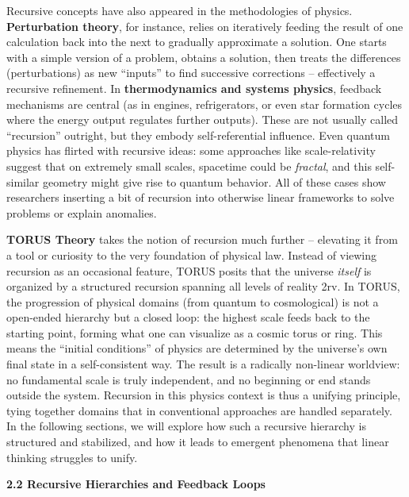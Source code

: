 \documentclass[
]{article}
\begin{document}
Recursive concepts have also appeared in the methodologies of physics.
\textbf{Perturbation theory}, for instance, relies on iteratively
feeding the result of one calculation back into the next to gradually
approximate a solution. One starts with a simple version of a problem,
obtains a solution, then treats the differences (perturbations) as new
``inputs'' to find successive corrections -- effectively a recursive
refinement. In \textbf{thermodynamics and systems physics}, feedback
mechanisms are central (as in engines, refrigerators, or even star
formation cycles where the energy output regulates further outputs).
These are not usually called ``recursion'' outright, but they embody
self-referential influence. Even quantum physics has flirted with
recursive ideas: some approaches like scale-relativity suggest that on
extremely small scales, spacetime could be \emph{fractal}, and this
self-similar geometry might give rise to quantum behavior\hspace{0pt}.
All of these cases show researchers inserting a bit of recursion into
otherwise linear frameworks to solve problems or explain anomalies.

\textbf{TORUS Theory} takes the notion of recursion much further --
elevating it from a tool or curiosity to the very foundation of physical
law. Instead of viewing recursion as an occasional feature, TORUS posits
that the universe \emph{itself} is organized by a structured recursion
spanning all levels of reality\hspace{0pt} 2rv. In TORUS, the
progression of physical domains (from quantum to cosmological) is not a
open-ended hierarchy but a closed loop: the highest scale feeds back to
the starting point, forming what one can visualize as a cosmic torus or
ring. This means the ``initial conditions'' of physics are determined by
the universe's own final state in a self-consistent way. The result is a
radically non-linear worldview: no fundamental scale is truly
independent, and no beginning or end stands outside the system.
Recursion in this physics context is thus a unifying principle, tying
together domains that in conventional approaches are handled separately.
In the following sections, we will explore how such a recursive
hierarchy is structured and stabilized, and how it leads to emergent
phenomena that linear thinking struggles to unify.

\textbf{2.2 Recursive Hierarchies and Feedback Loops}
\end{document}
